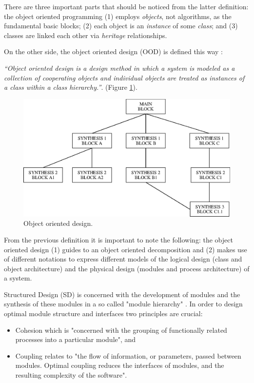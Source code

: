 \documentclass[twocolumn]{IEEEtran}
\begin{document}
There are three important parts that should be noticed from the latter definition: the object oriented programming (1) employs {\it objects}, not algorithms, as the fundamental basic blocks; (2) each object is an {\it instance} of some {\it class}; and (3) classes are linked each other via {\it heritage} relationships.

On the other side, the object oriented design (OOD) is defined this way \cite{booch}:

\begin{description}
\item {\it ``Object oriented design is a design method in which a system is modeled as a collection of cooperating objects and individual objects are treated as instances of a class within a class hierarchy.''}. (Figure \ref{fig:sd}).
\end{description}

\begin{figure}[hbtp]
	\centering
	\includegraphics[scale=0.5]{figures/ed.eps}
	\caption{Object oriented design.}
	\label{fig:sd}
\end{figure}

From the previous definition it is important to note the following: the object oriented design (1) guides to an object oriented decomposition and (2) makes use of different notations to express different models of the logical design (class and object architecture) and the physical design (modules and process architecture) of a system.

Structured Design (SD) is concerned with the development of modules and the synthesis of these modules in a so called "module hierarchy" \cite{pagejones}. In order to design optimal module structure and interfaces two principles are crucial:
\begin{itemize}
    \item Cohesion which is "concerned with the grouping of functionally related processes into a particular module"\cite{hecht}, and
    \item Coupling relates to "the flow of information, or parameters, passed between modules. Optimal coupling reduces the interfaces of modules, and the resulting complexity of the software".\cite{hecht}
\end{itemize}    
\end{document}
